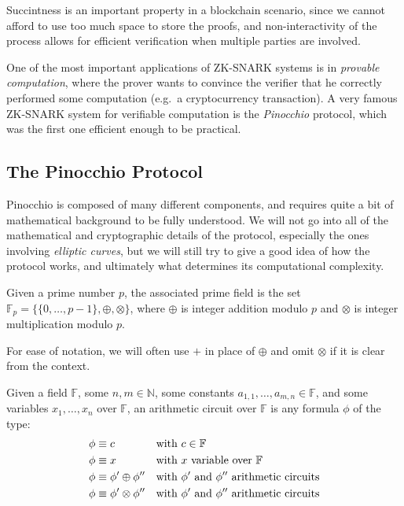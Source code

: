 \noindent Succintness is an important property in a blockchain scenario, since we cannot
afford to use too much space to store the proofs, and non-interactivity of the process allows for
efficient verification when multiple parties are involved.

One of the most important applications of ZK-SNARK systems is in \emph{provable computation},
where the prover wants to convince the verifier that he correctly performed some computation
(e.g.\ a cryptocurrency transaction).
A very famous ZK-SNARK system for verifiable computation is the \emph{Pinocchio} protocol,
which was the first one efficient enough to be practical.

\subsection{The Pinocchio Protocol}
Pinocchio is composed of many different components, and requires quite a bit of mathematical
background to be fully understood. We will not go into all of the mathematical and cryptographic
details of the protocol, especially the ones involving \emph{elliptic curves},
but we will still try to give a good idea of how the protocol works, and ultimately what
determines its computational complexity.
\begin{definition}
	Given a prime number \(p\), the associated prime field is the set
	\(\mathbb{F}_p = \{ \{0, \dots, p - 1\}, \oplus, \otimes \} \), where \(\oplus \) is integer
	addition modulo \(p\) and \(\otimes \) is integer multiplication modulo \(p\).
\end{definition}

\noindent For ease of notation, we will often use \(+\) in place of \(\oplus \) and omit
\(\otimes \) if it is clear from the context.

\begin{definition}
	Given a field \(\mathbb{F}\), some \(n, m \in \mathbb{N}\), some constants
	\(a_{1, 1}, \dots, a_{m, n} \in \mathbb{F}\), and some variables \(x_1, \dots, x_n \) over
	\(\mathbb{F}\), an arithmetic circuit over \(\mathbb{F}\) is any formula \(\phi \) of the type:
	\begin{align*}
		 & \phi \equiv c                    &  & \textnormal{with \(c \in \mathbb{F}\)}
		\\
		 & \phi \equiv x                    &  & \textnormal{with \(x\) variable over \(\mathbb{F}\)}
		\\
		 & \phi \equiv \phi' \oplus \phi''  &  & \textnormal{with \(\phi'\) and \(\phi''\) arithmetic
			circuits}
		\\
		 & \phi \equiv \phi' \otimes \phi'' &  & \textnormal{with \(\phi'\) and \(\phi''\) arithmetic
			circuits}
	\end{align*}
\end{definition}

